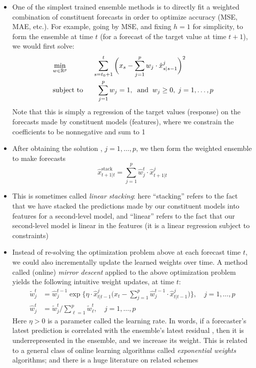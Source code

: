 \documentclass{article}
\begin{document}
\begin{itemize}
\item One of the simplest trained ensemble methods is to directly fit a weighted 
  combination of constituent forecasts in order to optimize accuracy (MSE, MAE,
  etc.). For example, going by MSE, and fixing $h=1$ for simplicity, to form the
  ensemble at time $t$ (for a forecast of the target value at time $t+1$), we
  would first solve:
  \begin{alignat*}{2}
  &\min_{w \in \mathbb{R}^p} && \hspace{-6pt} \sum_{s=t_0+1}^t \bigg( x_s - \sum_{j=1}^p
  w_j \cdot \hat{x}^j_{s|s-1} \bigg)^2 \\   
  &\operatorname{subject\,\,to} \quad && \sum_{j=1}^p w_j = 1, \;\;\text{and} \;\; w_j \geq 0, \;
  j=1,\dots,p   
  \end{alignat*}
  Note that this is simply a regression of the target values (response) on the
  forecasts made by constituent models (features), where we constrain the
  coefficients to be nonnegative and sum to 1

\item After obtaining the solution , $j = 1,\dots,p$, we
  then form the weighted ensemble to make forecasts 
  \[
  \hat{x}^{\text{stack}}_{t+1|t} = \sum_{j=1}^p \hat{w}^t_j \cdot
  \hat{x}^j_{t+1|t} 
  \]

\item This is sometimes called \emph{linear stacking}: here ``stacking'' refers
  to the fact that we have stacked the predictions made by our constituent
  models into features for a second-level model, and ``linear'' refers to the
  fact that our second-level model is linear in the features (it is a linear
  regression subject to constraints)  

\item Instead of re-solving the optimization problem above at each forecast time
  $t$, we could also incrementally update the learned weights over time. A
  method called (online) \emph{mirror descent} applied to the above optimization
  problem yields the following intuitive weight updates, at time $t$:    
  \begin{align*}
  \tilde{w}^t_j &= \hat{w}^{t-1}_j \exp\bigg\{ \eta \cdot \hat{x}^j_{t|t-1}
    \bigg( x_t -  \sum_{j=1}^p \hat{w}^{t-1}_j \cdot \hat{x}^j_{t|t-1} \bigg)
    \bigg\}, \quad j = 1,\dots,p \\
  \hat{w}^t_j &= \tilde{w}^t_j \bigg/ \sum_{\ell=1}^p \tilde{w}^t_\ell, \quad j =
    1,\dots,p 
  \end{align*}
  Here $\eta > 0$ is a parameter called the learning rate. In words, if a
  forecaster's latest prediction  is correlated with
  the ensemble's latest residual , then it is underrepresented in the ensemble, and
  we increase its weight. This is related to a general class of online learning 
  algorithms called \emph{exponential weights} algorithms; and there is a 
  huge literature on related schemes


\end{itemize}
\end{document}
